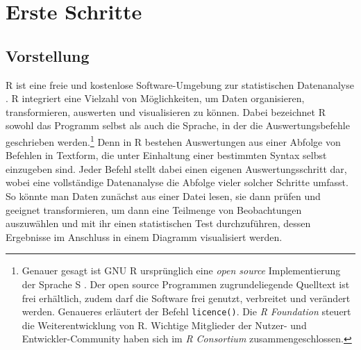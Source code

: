 \chapter{Erste Schritte}
\label{sec:firstSteps}

\section{Vorstellung}
\label{sec:intro}

R ist eine freie und kostenlose Software-Umgebung zur statistischen Datenanalyse \cite{Ihaka1996, RDevelopmentCoreTeam2008c}. R integriert eine Vielzahl von Möglichkeiten, um Daten organisieren, transformieren, auswerten und visualisieren zu können. Dabei bezeichnet R sowohl das Programm selbst als auch die Sprache, in der die Auswertungsbefehle geschrieben werden.\footnote{Genauer gesagt ist GNU R ursprünglich eine \emph{open source} Implementierung der Sprache S \cite{Becker1988}. Der open source Programmen zugrundeliegende Quelltext ist frei erhältlich, zudem darf die Software frei genutzt, verbreitet und verändert werden. Genaueres erläutert der Befehl \lstinline!licence()!. Die \emph{R Foundation} \cite{RFoundation2024} steuert die Weiterentwicklung von R. Wichtige Mitglieder der Nutzer- und Entwickler-Community haben sich im \emph{R Consortium} \cite{RConsortium2024} zusammengeschlossen.} Denn in R bestehen Auswertungen aus einer Abfolge von Befehlen in Textform, die unter Einhaltung einer bestimmten Syntax selbst einzugeben sind. Jeder Befehl stellt dabei einen eigenen Auswertungsschritt dar, wobei eine vollständige Datenanalyse die Abfolge vieler solcher Schritte umfasst. So könnte man Daten zunächst aus einer Datei lesen, sie dann prüfen und geeignet transformieren, um dann eine Teilmenge von Beobachtungen auszuwählen und mit ihr einen statistischen Test durchzuführen, dessen Ergebnisse im Anschluss in einem Diagramm visualisiert werden.


